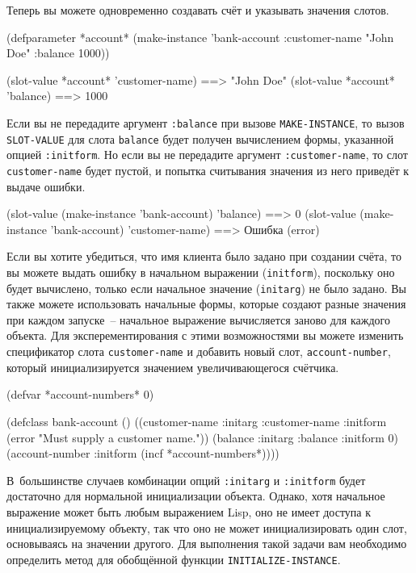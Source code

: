 Теперь вы можете одновременно создавать счёт и указывать значения слотов.

\begin{myverb}
(defparameter *account*
  (make-instance 'bank-account :customer-name "John Doe" :balance 1000))

  (slot-value *account* 'customer-name) ==> "John Doe"
  (slot-value *account* 'balance)       ==> 1000
\end{myverb}

Если вы не передадите аргумент \lstinline{:balance} при вызове \lstinline{MAKE-INSTANCE}, то вызов
\lstinline{SLOT-VALUE} для слота \lstinline{balance} будет получен вычислением формы, указанной
опцией \lstinline{:initform}.  Но если вы не передадите аргумент \lstinline{:customer-name}, то
слот \lstinline{customer-name} будет пустой, и попытка считывания значения из него приведёт к
выдаче ошибки.

\begin{myverb}
(slot-value (make-instance 'bank-account) 'balance)       ==> 0
(slot-value (make-instance 'bank-account) 'customer-name) ==> Ошибка (error)
\end{myverb}

Если вы хотите убедиться, что имя клиента было задано при создании счёта, то вы можете
выдать ошибку в начальном выражении (\lstinline{initform}), поскольку оно будет вычислено,
только если начальное значение (\lstinline{initarg}) не было задано.  Вы также можете
использовать начальные формы, которые создают разные значения при каждом запуске~--
начальное выражение вычисляется заново для каждого объекта.  Для эксперементирования с
этими возможностями вы можете изменить спецификатор слота \lstinline{customer-name} и добавить
новый слот, \lstinline{account-number}, который инициализируется значением увеличивающегося
счётчика.

\begin{myverb}
(defvar *account-numbers* 0)

(defclass bank-account ()
  ((customer-name
    :initarg :customer-name
    :initform (error "Must supply a customer name."))
   (balance
    :initarg :balance
    :initform 0)
   (account-number
    :initform (incf *account-numbers*))))
\end{myverb}

В~большинстве случаев комбинации опций \lstinline{:initarg} и \lstinline{:initform} будет
достаточно для нормальной инициализации объекта.  Однако, хотя начальное выражение может
быть любым выражением Lisp, оно не имеет доступа к инициализируемому объекту, так что оно
не может инициализировать один слот, основываясь на значении другого.  Для выполнения
такой задачи вам необходимо определить метод для обобщённой функции
\lstinline{INITIALIZE-INSTANCE}.

